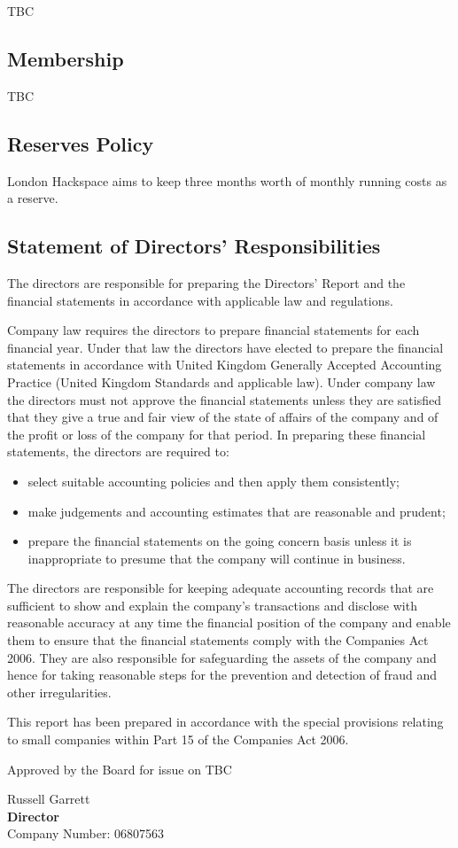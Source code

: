 TBC

\subsection{Membership}

TBC

\subsection{Reserves Policy}

London Hackspace aims to keep three months worth of monthly running costs as a reserve.

\subsection{Statement of Directors' Responsibilities}
The directors are responsible for preparing the Directors' Report and the financial statements in accordance with applicable law and regulations.

Company law requires the directors to prepare financial statements for each financial year. Under that law the directors have elected to prepare the financial statements in accordance with United Kingdom Generally Accepted Accounting Practice (United Kingdom Standards and applicable law). Under company law the directors must not approve the financial statements unless they are satisfied that they give a true and fair view of the state of affairs of the company and of the profit or loss of the company for that period. In preparing these financial statements, the directors are required to:

\begin{itemize}
    \item select suitable accounting policies and then apply them consistently;
    \item make judgements and accounting estimates that are reasonable and prudent;
    \item prepare the financial statements on the going concern basis unless it is inappropriate to presume that the company will continue in business.
\end{itemize}

The directors are responsible for keeping adequate accounting records that are sufficient to show and explain the company's transactions and disclose with reasonable accuracy at any time the financial position of the company and enable them to ensure that the financial statements comply with the Companies Act 2006. They are also responsible for safeguarding the assets of the company and hence for taking reasonable steps for the prevention and detection of fraud and other irregularities.

This report has been prepared in accordance with the special provisions relating to small companies within Part 15 of the Companies Act 2006.

Approved by the Board for issue on TBC
\vspace{48pt}

Russell Garrett \\
{\bf Director} \\
Company Number: 06807563
